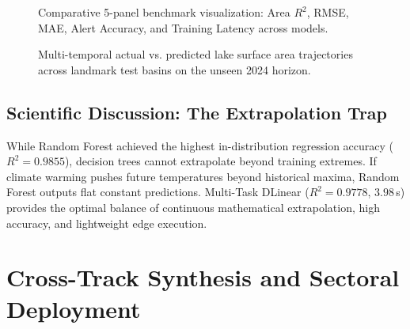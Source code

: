 \documentclass[12pt,a4paper]{report}
\begin{document}
\begin{figure}[H]
\centering
\caption{Comparative 5-panel benchmark visualization: Area $R^2$, RMSE, MAE, Alert Accuracy, and Training Latency across models.}
\label{fig:glof_benchmark_comparison}
\end{figure}

\begin{figure}[H]
\centering
\caption{Multi-temporal actual vs. predicted lake surface area trajectories across landmark test basins on the unseen 2024 horizon.}
\label{fig:glof_trajectories}
\end{figure}

\section{Scientific Discussion: The Extrapolation Trap}
While Random Forest achieved the highest in-distribution regression accuracy ($R^2 = 0.9855$), decision trees cannot extrapolate beyond training extremes. If climate warming pushes future temperatures beyond historical maxima, Random Forest outputs flat constant predictions. Multi-Task DLinear ($R^2 = 0.9778$, $3.98$\,s) provides the optimal balance of continuous mathematical extrapolation, high accuracy, and lightweight edge execution.


\chapter{Cross-Track Synthesis and Sectoral Deployment}
\end{document}

